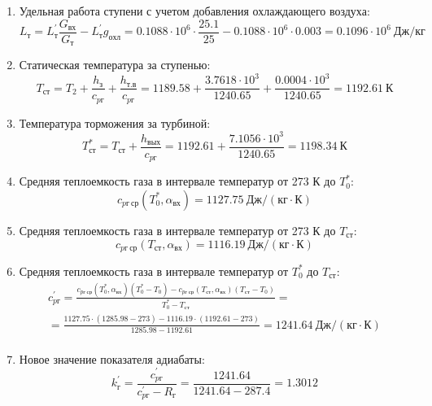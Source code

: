 \documentclass[a4paper,10pt]{article}
\begin{document}
\begin{enumerate}
        

        \item Удельная работа ступени с учетом добавления охлаждающего воздуха:
        \[
            L_т = L_т^\prime \frac{ G_{вх} }{ G_т }  - L_т^\prime g_{охл} =
                0.1088 \cdot 10^6 \cdot
                \frac{ 25.1 }{ 25 }  -
                0.1088 \cdot 10^6 \cdot 0.003 =
            0.1096 \cdot 10^6 \ Дж/кг
        \]

        \item Статическая температура за ступенью:
        \[
            T_{ст} = T_2 + \frac{ h_з }{ c_{pг} } + \frac{ h_{т.в} }{ c_{pг} } =
                1189.58 +
                \frac{3.7618 \cdot 10^3 }{ 1240.65 } +
                \frac{ 0.0004 \cdot 10^3 }{ 1240.65 } =
            1192.61 \ К
        \]

        \item Температура торможения за турбиной:
        \[
            T_{ст}^* = T_{ст} + \frac{ h_{вых} }{ c_{pг} } =
                1192.61 +
                \frac{ 7.1056 \cdot 10^3 }{ 1240.65 } =
            1198.34 \ К
        \]

        \item Средняя теплоемкость газа в интервале температур от 273 К до $T_0^*$:
        \[
            c_{pг\ ср} (T_0^*, \alpha_{вх}) =
            1127.75 \ Дж/(кг \cdot К)
        \]

        \item Средняя теплоемкость газа в интервале температур от 273 К до $T_{ст}$:
        \[
            c_{pг\ ср} (T_{ст}, \alpha_{вх}) =
            1116.19 \ Дж/(кг \cdot К)
        \]

        \item Средняя теплоемкость газа в интервале температур от $T_0^*$ до $T_{ст}$:
        \begin{gather*}
            c_{pг}^\prime = \frac{
		        c_{pг\ ср} (T_0^*, \alpha_{вх}) (T_0^* - T_0) - c_{pг\ ср} (T_{ст}, \alpha_{вх})(T_{ст} - T_0)
		    }{
		        T_0^* - T_{ст}} =\\
            =\frac{
		        1127.75 \cdot
                (1285.98 - 273) -
		        1116.19 \cdot
                (1192.61 - 273)
		    }{
		        1285.98 - 1192.61} =
		    1241.64 \ Дж / (кг \cdot К)\\
        \end{gather*}

        \item Новое значение показателя адиабаты:
        \[
            k_г^\prime = \frac{c_{pг}^\prime}{c_{pг}^\prime - R_г} =
                \frac{
                    1241.64
                }{
                    1241.64 - 287.4
                }
            = 1.3012
        \]


\end{enumerate}
\end{document}
